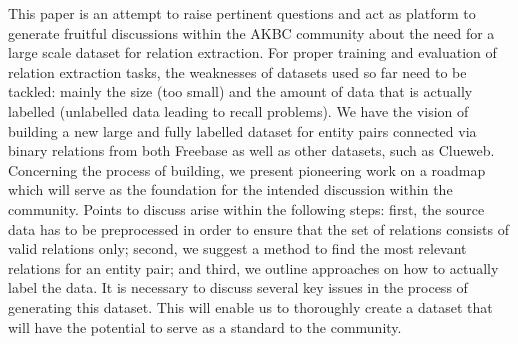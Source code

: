 This paper is an attempt to raise pertinent questions and act as platform to generate fruitful discussions within the AKBC community about the need for a large scale dataset for relation extraction. For proper training and evaluation of relation extraction tasks, the weaknesses of datasets used so far need to be tackled: mainly the size (too small) and the amount of data that is actually labelled (unlabelled data leading to recall problems). We have the vision of building a new large and fully labelled dataset for entity pairs connected via binary relations from both Freebase as well as other datasets, such as Clueweb. Concerning the process of building, we present pioneering work on a roadmap which will serve as the foundation for the intended discussion within the community. Points to discuss arise within the following steps: first, the source data has to be preprocessed in order to ensure that the set of relations consists of valid relations only; second, we suggest a method to find the most relevant relations for an entity pair; and third, we outline approaches on how to actually label the data. It is necessary to discuss several key issues in the process of generating this dataset. This will enable us to thoroughly create a dataset that will have the potential to serve as a standard to the community.
